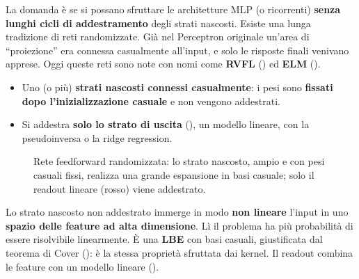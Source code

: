 La domanda è se si possano sfruttare le architetture MLP (o ricorrenti) \textbf{senza lunghi cicli di addestramento}
degli strati nascosti. Esiste una lunga tradizione di reti randomizzate. Già nel Perceptron originale un'area di
``proiezione'' era connessa casualmente all'input, e solo le risposte finali venivano apprese. Oggi queste reti
sono note con nomi come \textbf{RVFL} () ed \textbf{ELM} ().

\begin{definizione}
\begin{itemize}
  \item Uno (o più) \textbf{strati nascosti connessi casualmente}: i pesi sono \textbf{fissati dopo l'inizializzazione
        casuale} e non vengono addestrati.
  \item Si addestra \textbf{solo lo strato di uscita} (), un modello lineare, con la pseudoinversa o
        la ridge regression.
\end{itemize}
\end{definizione}

\begin{figure}[ht]
\centering
{}
\caption{Rete feedforward randomizzata: lo strato nascosto, ampio e con pesi casuali fissi, realizza una grande
espansione in basi casuale; solo il readout lineare (rosso) viene addestrato.}
\label{fig:rete-random}
\end{figure}

Lo strato nascosto non addestrato immerge in modo \textbf{non lineare} l'input in uno \textbf{spazio delle feature ad
alta dimensione}. Lì il problema ha più probabilità di essere risolvibile linearmente. È una \textbf{LBE} con basi
casuali, giustificata dal teorema di Cover (): è la stessa proprietà sfruttata dai kernel. Il
readout combina le feature con un modello lineare ().


